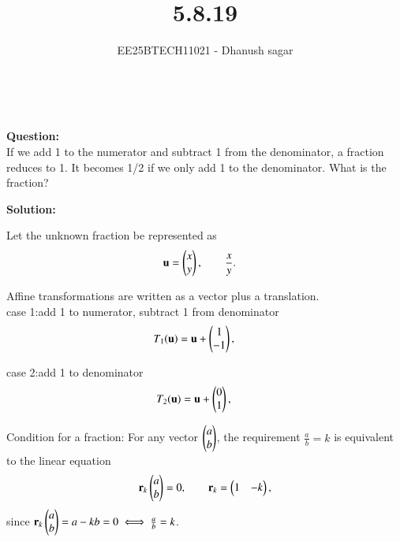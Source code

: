 \documentclass[journal]{IEEEtran}
\begin{document}


\title{5.8.19}
\author{EE25BTECH11021 - Dhanush sagar}
\maketitle \vspace{-1cm}
\renewcommand{\thefigure}{\theenumi}
\renewcommand{\thetable}{\theenumi}
\setlength{\intextsep}{10pt} %

\
\renewcommand{\thetable}{\theenumi}

\textbf{Question:}  \\
If we add 1 to the numerator and subtract 1 from the denominator, a fraction reduces
to 1. It becomes 1/2 if we only add 1 to the denominator. What is the fraction?


\textbf{Solution:}


Let the unknown fraction be represented as
\begin{align}
\mathbf{u} &= \begin{pmatrix}x \\ y\end{pmatrix}, \qquad 
\frac{x}{y}.
\end{align}

Affine transformations are written as a vector plus a translation.\\

case 1:add 1 to numerator, subtract 1 from denominator
\begin{align}
T_1(\mathbf{u}) &= \mathbf{u} + \begin{pmatrix}1 \\ -1\end{pmatrix}, \quad 
\end{align}

case 2:add 1 to denominator
\begin{align}
T_2(\mathbf{u}) &= \mathbf{u} + \begin{pmatrix}0 \\ 1\end{pmatrix}, \quad
\end{align}

Condition for a fraction:  
For any vector $\begin{pmatrix}a \\ b\end{pmatrix}$, the requirement $\tfrac{a}{b}=k$ is equivalent to the linear equation
\begin{align}
\mathbf{r}_k \begin{pmatrix}a \\ b\end{pmatrix} = 0, 
\qquad \mathbf{r}_k = \begin{pmatrix}1 & -k\end{pmatrix},
\end{align}
since $\mathbf{r}_k \begin{pmatrix}a \\ b\end{pmatrix} = a - kb = 0 \iff \tfrac{a}{b}=k$.
\end{document}
